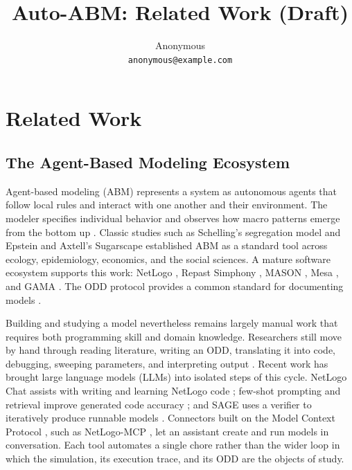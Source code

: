 \documentclass[11pt]{article}
\title{Auto-ABM: Related Work (Draft)}
\author{Anonymous \\
  \texttt{anonymous@example.com}}
\begin{document}
\maketitle

\section{Related Work}

\subsection{The Agent-Based Modeling Ecosystem}

Agent-based modeling (ABM) represents a system as autonomous agents that follow
local rules and interact with one another and their environment. The modeler
specifies individual behavior and observes how macro patterns emerge from the
bottom up \citep{bonabeau2002abm,macal2010tutorial}. Classic studies such as
Schelling's segregation model \citep{schelling1971segregation} and Epstein and
Axtell's Sugarscape \citep{epstein1996growing} established ABM as a standard
tool across ecology, epidemiology, economics, and the social sciences. A mature
software ecosystem supports this work: NetLogo \citep{wilensky1999netlogo},
Repast Simphony \citep{north2013repast}, MASON \citep{luke2005mason}, Mesa
\citep{kazil2020mesa,terhoeven2025mesa3}, and GAMA \citep{taillandier2019gama}.
The ODD protocol provides a common standard for documenting models
\citep{grimm2006odd,grimm2020odd}.

Building and studying a model nevertheless remains largely manual work that
requires both programming skill and domain knowledge. Researchers still move by
hand through reading literature, writing an ODD, translating it into code,
debugging, sweeping parameters, and interpreting output
\citep{macal2010tutorial,grimm2020odd}. Recent work has brought large language
models (LLMs) into isolated steps of this cycle. NetLogo Chat assists with
writing and learning NetLogo code \citep{chen2024netlogochat}; few-shot prompting
and retrieval improve generated code accuracy \citep{martinez2024netlogo}; and
SAGE uses a verifier to iteratively produce runnable models
\citep{niu2024sage}. Connectors built on the Model Context Protocol
\citep{mcp2024}, such as NetLogo-MCP \citep{netlogomcp2025}, let an assistant
create and run models in conversation. Each tool automates a single chore rather
than the wider loop in which the simulation, its execution trace, and its ODD
are the objects of study.
\end{document}
